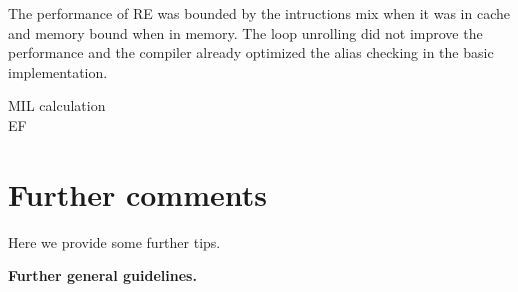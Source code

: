 \documentclass[letterpaper]{article}
\newcommand{\mypar}[1]{{\bf #1.}}
\begin{document}
The performance of RE was bounded by the intructions mix when it was in cache and memory bound when in memory. The loop unrolling did not improve the performance and the compiler already optimized the alias checking in the basic implementation.

MIL calculation\\

EF\\


\section{Further comments}

Here we provide some further tips. 

\mypar{Further general guidelines}



\end{document}
